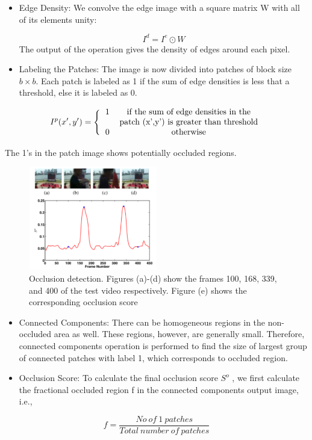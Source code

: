 \documentclass{sig-alternate}
\begin{document}
\begin{itemize}  
\item Edge Density: We convolve the edge image with a square
matrix W with all of its elements unity:

\begin{equation}
    I^d = I^e \odot W
\end{equation}
The output of the operation gives the density of edges around
each pixel.
\end{itemize}

\begin{itemize}
\item Labeling the Patches: The image is now divided into patches
of block size $b \times b$.
Each patch is labeled as 1 if the sum of
edge densities is less that a threshold, else it is labeled as 0.
\end{itemize}


\begin{equation} I^p(x',y') = \Bigg\{ 
\begin{tabular}{cc}
      1  & if the sum of edge densities in the\\
         & patch (x',y') is greater than threshold\\
      0  & otherwise
\end{tabular}  
\end{equation}

The 1's in the patch image shows potentially occluded regions.
\begin{figure}[h]
	\centering
	\includegraphics[width=0.5\textwidth]{img3.png}
	\caption{Occlusion detection. Figures (a)-(d) show the frames
		100, 168, 339, and 400 of the test video respectively. Figure (e)
		shows the corresponding occlusion score}
	\label{fig:mesh3}
\end{figure}
\begin{itemize}
\item Connected Components: There can be homogeneous regions
in the non-occluded area as well. These regions, however, are
generally small. Therefore, connected components operation
is performed to find the size of largest group of connected
patches with label 1, which corresponds to occluded region.

\item Occlusion Score: To calculate the final occlusion score $S^o$ , we first calculate the fractional occluded region f in the connected components output image, i.e.,
\end{itemize}
\begin{equation}
    f =  \frac {No \ of \ 1 \ patches}{Total \ number \ of \ patches} 
\end{equation}
\end{document}
